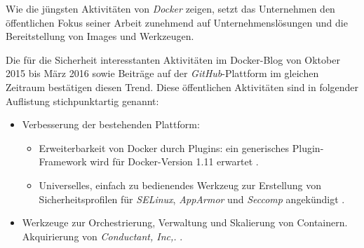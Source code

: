 \documentclass[../main.tex]{subfiles}
\begin{document}
  Wie die jüngsten Aktivitäten von \emph{Docker} zeigen, setzt das Unternehmen den öffentlichen Fokus seiner Arbeit zunehmend auf Unternehmenslösungen und die Bereitstellung von Images und Werkzeugen.

  Die für die Sicherheit interesstanten Aktivitäten im Docker-Blog von Oktober 2015 bis März 2016 sowie Beiträge auf der \emph{GitHub}-Plattform im gleichen Zeitraum bestätigen diesen Trend. Diese öffentlichen Aktivitäten sind in folgender Auflistung stichpunktartig genannt:

  \begin{itemize}
    \item Verbesserung der bestehenden Plattform:
      \begin{itemize}
        \item Erweiterbarkeit von Docker durch Plugins: ein generisches Plugin-Framework wird für Docker-Version 1.11 erwartet \cite{githubDockerRoadmap}\cite{https://github.com/docker/docker/pull/15365}.
        \item Universelles, einfach zu bedienendes Werkzeug zur Erstellung von Sicherheitsprofilen für \emph{SELinux}, \emph{AppArmor} und \emph{Seccomp} angekündigt \cite{githubGeneralSecProfiles}.
      \end{itemize}
    \item Werkzeuge zur Orchestrierung, Verwaltung und Skalierung von Containern. Akquirierung von \emph{Conductant, Inc,.} \cite{https://blog.docker.com/2016/03/docker-welcomes-aurora-project-creators/}.%

\end{itemize}
\end{document}
